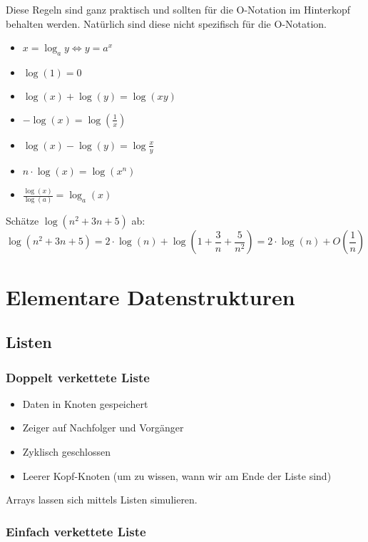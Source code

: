 \documentclass[11pt]{scrartcl}
\begin{document}
Diese Regeln sind ganz praktisch und sollten für die O-Notation im Hinterkopf behalten werden. Natürlich sind diese nicht spezifisch für die O-Notation.

\begin{itemize}
	\item $x=\log_a y \Leftrightarrow y = a^x$
    \item $\log(1) = 0$
    \item $\log(x) + \log(y) = \log (xy)$
    \item $-\log(x) = \log (\frac{1}{x})$
    \item $\log(x)-\log(y)=\log\frac{x}{y}$
    \item $n \cdot \log(x)=\log(x^n)$
    \item $\frac{\log(x)}{\log(a)}=\log_a(x)$
\end{itemize}

Schätze $\log(n^2+3n+5)$ ab:
$$\log(n^2+3n+5)=2 \cdot \log(n) + \log(1+\frac{3}{n}+\frac{5}{n^2})=2 \cdot \log(n)+O(\frac{1}{n})$$

\section{Elementare Datenstrukturen}

\subsection{Listen}

\subsubsection{Doppelt verkettete Liste}

\begin{itemize}
	\item Daten in Knoten gespeichert
    \item Zeiger auf Nachfolger und Vorgänger
    \item Zyklisch geschlossen
	\item Leerer Kopf-Knoten (um zu wissen, wann wir am Ende der Liste sind)
\end{itemize}

Arrays lassen sich mittels Listen simulieren.

\subsubsection{Einfach verkettete Liste}
\end{document}
